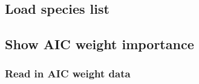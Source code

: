 \documentclass[]{article}
\newenvironment{Shaded}{}{}
\newcommand{\CommentTok}[1]{\textcolor[rgb]{0.00,0.50,0.00}{#1}}
\newcommand{\KeywordTok}[1]{\textcolor[rgb]{0.00,0.00,1.00}{#1}}
\newcommand{\NormalTok}[1]{#1}
\newcommand{\OperatorTok}[1]{#1}
\newcommand{\StringTok}[1]{\textcolor[rgb]{0.00,0.50,0.50}{#1}}
\begin{document}
\hypertarget{load-species-list}{%
\subsection{Load species list}\label{load-species-list}}

\begin{Shaded}
\end{Shaded}

\hypertarget{show-aic-weight-importance}{%
\subsection{Show AIC weight importance}\label{show-aic-weight-importance}}

\hypertarget{read-in-aic-weight-data}{%
\subsubsection{Read in AIC weight data}\label{read-in-aic-weight-data}}
\end{document}
